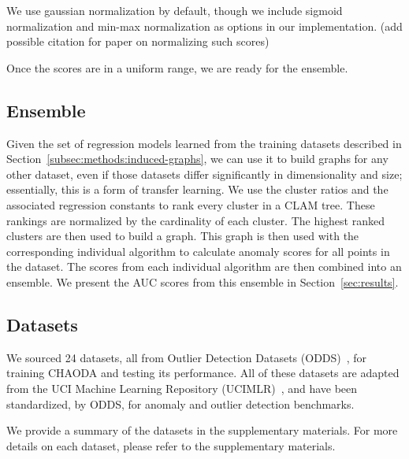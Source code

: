 We use gaussian normalization by default, though we include sigmoid normalization and min-max normalization as options in our implementation. (add possible citation for paper on normalizing such scores)


Once the scores are in a uniform range, we are ready for the ensemble.


\subsection{Ensemble}\label{subsec:methods:ensemble}
Given the set of regression models learned from the training datasets described in Section~\ref{subsec:methods:induced-graphs}, we can use it to build graphs for any other dataset, even if those datasets differ significantly in dimensionality and size; essentially, this is a form of transfer learning.
We use the cluster ratios and the associated regression constants to rank every cluster in a CLAM tree.
These rankings are normalized by the cardinality of each cluster.
The highest ranked clusters are then used to build a graph.
This graph is then used with the corresponding individual algorithm to calculate anomaly scores for all points in the dataset.
The scores from each individual algorithm are then combined into an ensemble.
We present the AUC scores from this ensemble in Section~\ref{sec:results}.



\subsection{Datasets}\label{subsec:methods:datasets}

We sourced 24 datasets, all from Outlier Detection Datasets (ODDS)~\cite{rayana2016odds}, for training CHAODA and testing its performance.
All of these datasets are adapted from the UCI Machine Learning Repository (UCIMLR)~\cite{UCIMLR}, and have been standardized, by ODDS, for anomaly and outlier detection benchmarks.

We provide a summary of the datasets in the supplementary materials.
For more details on each dataset, please refer to the supplementary materials.



